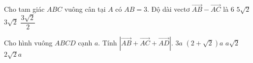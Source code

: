 \begin{ex}%
	Cho tam giác $ABC$ vuông cân tại $A$ có $AB=3$. Độ dài vectơ $\overrightarrow{AB}-\overrightarrow{AC}$ là
	\choice
	{$6$}
	{$5\sqrt{2}$}
	{\True $3\sqrt{2}$}
	{$\dfrac{3\sqrt{2}}{2}$}
\end{ex}

\begin{ex}%
	Cho hình vuông $ABCD$ cạnh $a$. Tính $\left| \overrightarrow{AB}+\overrightarrow{AC}+\overrightarrow{AD}\right|$.
	\choice 
	{$3a$}
	{$\left( 2+\sqrt{2} \right)a$}
	{$a\sqrt{2}$}
	{\True $2\sqrt{2}a$}
\end{ex}

